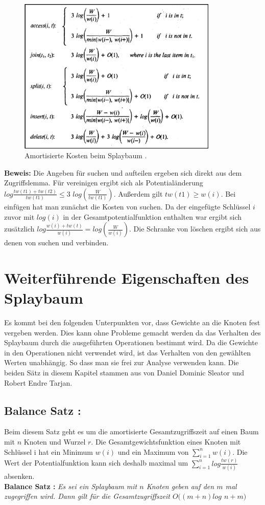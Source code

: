 \documentclass[11pt, a4paper]{article}
\begin{document}
\begin{figure}[H] 
	\centering
	\includegraphics[width=0.85\textwidth]{"bilder/kostenOps"}
	\caption{Amortisierte Kosten beim Splaybaum \cite{sl2}. }
	\label{fig:kostenOps}
\end{figure}  
\noindent\textbf{Beweis:} 
Die Angeben für suchen und aufteilen ergeben sich direkt aus dem Zugriffslemma. Für vereinigen ergibt sich als Potentialänderung $log \frac{tw(t1) + tw(t2)}{tw(t1)}  \leq  3$ $log (\frac{W}{tw(t1)})$. Außerdem gilt $tw(t1) \geq w(i)$.
Bei einfügen hat man zunächst die Kosten von suchen. Da der eingefügte Schlüssel $i$ zuvor mit $log(i)$ in der Gesamtpotentialfunktion enthalten war ergibt sich zusätzlich $log \frac{w(i) + tw(t)}{w(i)} = log(\frac{W}{w(i)})$.
Die Schranke von löschen ergibt sich aus denen von suchen und verbinden.


\section {Weiterführende Eigenschaften des Splaybaum}
Es kommt bei den folgenden Unterpunkten vor, dass Gewichte an die Knoten fest vergeben werden. Dies kann ohne Probleme gemacht werden da das Verhalten des Splaybaum durch die ausgeführten Operationen bestimmt wird. Da die Gewichte in den Operationen nicht verwendet wird, ist das Verhalten von den gewählten Werten unabhängig. So dass man sie frei zur Analyse verwenden kann. Die beiden Sätz in diesem Kapitel stammen aus \cite{sl2} von Daniel Dominic Sleator und  Robert Endre Tarjan. 


\subsection{Balance Satz \cite{sl2}:} 
Beim diesem Satz geht es um die amortisierte Gesamtzugriffszeit auf einen Baum mit $n$ Knoten und Wurzel $r$. Die Gesamtgewichtsfunktion eines Knoten mit Schlüssel i hat ein Minimum $w(i)$ und ein Maximum von $\sum \limits_{i = 1}^n w(i) $. Die Wert der Potentialfunktion kann sich deshalb maximal um $\sum \limits_{i = 1}^n  log \frac{tw(r)}{w(i)} $ absenken. \\
\noindent\textbf{Balance Satz \cite{sl2}: }\textit{Es sei ein Splaybaum mit $n$ Knoten geben auf den $m$ mal zugegriffen wird. Dann gilt für die Gesamtzugriffszeit $O((m + n)log$ $n + m)$} \\
\end{document}
